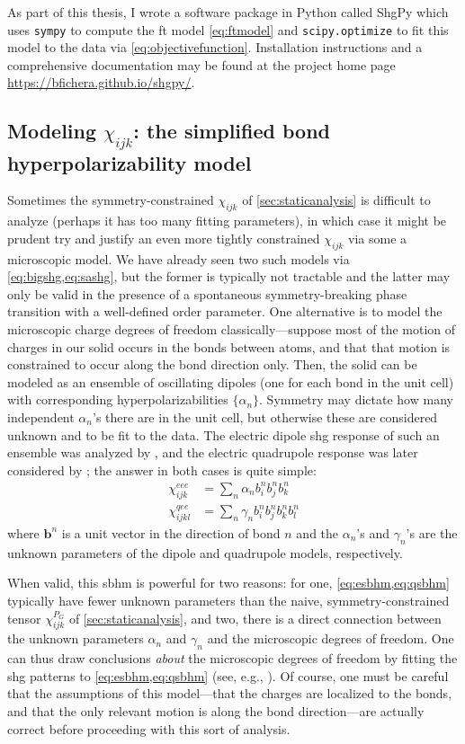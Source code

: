 As part of this thesis, I wrote a software package in Python called ShgPy which uses \texttt{sympy}\citep{sympy} to compute the \gls{ft} model \cref{eq:ftmodel} and \texttt{scipy.optimize}\citep{scipy} to fit this model to the data via \cref{eq:objectivefunction}.
Installation instructions and a comprehensive documentation may be found at the project home page \url{https://bfichera.github.io/shgpy/}.

\subsection{Modeling $\chi_{ijk}$: the simplified bond hyperpolarizability model}

Sometimes the symmetry-constrained $\chi_{ijk}$ of \cref{sec:staticanalysis} is difficult to analyze (perhaps it has too many fitting parameters), in which case it might be prudent try and justify an even more tightly constrained $\chi_{ijk}$ via some a microscopic model.
We have already seen two such models via \cref{eq:bigshg,eq:sashg}, but the former is typically not tractable and the latter may only be valid in the presence of a spontaneous symmetry-breaking phase transition with a well-defined order parameter.
One alternative is to model the microscopic charge degrees of freedom classically---suppose most of the motion of charges in our solid occurs in the bonds between atoms, and that that motion is constrained to occur along the bond direction only.
Then, the solid can be modeled as an ensemble of oscillating dipoles (one for each bond in the unit cell) with corresponding hyperpolarizabilities $\{\alpha_n\}$.
Symmetry may dictate how many independent $\alpha_n$'s there are in the unit cell, but otherwise these are considered unknown and to be fit to the data.
The electric dipole \gls{shg} response of such an ensemble was analyzed by \citet{powell_simplified_2002}, and the electric quadrupole response was later considered by \citet{bauer_bulk_2017}; the answer in both cases is quite simple:
\begin{align}
\chi^{eee}_{ijk} &= \sum_n \alpha_n b^n_i b^n_j b^n_k\label{eq:esbhm}\\
\chi^{qee}_{ijkl} &= \sum_n \gamma_n b^n_i b^n_j b^n_k b^n_l\label{eq:qsbhm}
\end{align}
where $\bm{b}^n$ is a unit vector in the direction of bond $n$ and the $\alpha_n$'s and $\gamma_n$'s are the unknown parameters of the dipole and quadrupole models, respectively.

When valid, this \gls{sbhm} is powerful for two reasons: for one, \cref{eq:esbhm,eq:qsbhm} typically have fewer unknown parameters than the naive, symmetry-constrained tensor $\chi_{ijk}^{P_G}$ of \cref{sec:staticanalysis}, and two, there is a direct connection between the unknown parameters $\alpha_n$ and $\gamma_n$ and the microscopic degrees of freedom.
One can thus draw conclusions \emph{about} the microscopic degrees of freedom by fitting the \gls{shg} patterns to \cref{eq:esbhm,eq:qsbhm} (see, e.g., \citet{ron_dimensional_2019}).
Of course, one must be careful that the assumptions of this model---that the charges are localized to the bonds, and that the only relevant motion is along the bond direction---are actually correct before proceeding with this sort of analysis.


